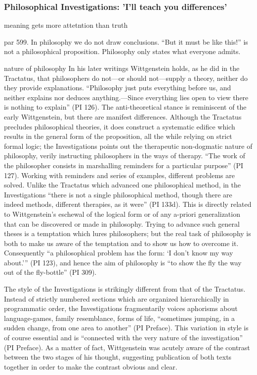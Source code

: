 \documentclass[../main.tex]{subfiles}
\begin{document}
\subsubsection{Philosophical Investigations: 'I'll teach you differences'}

meaning gets more attetntion than truth

par 599. In philosophy we do not draw conclusions. ``But it must be like this!'' is not a philosophical proposition. Philosophy only states what everyone admits.

nature of philosophy
In his later writings Wittgenstein holds, as he did in the Tractatus, that philosophers do not—or should not—supply a theory, neither do they provide explanations. “Philosophy just puts everything before us, and neither explains nor deduces anything.—Since everything lies open to view there is nothing to explain” (PI 126). The anti-theoretical stance is reminiscent of the early Wittgenstein, but there are manifest differences. Although the Tractatus precludes philosophical theories, it does construct a systematic edifice which results in the general form of the proposition, all the while relying on strict formal logic; the Investigations points out the therapeutic non-dogmatic nature of philosophy, verily instructing philosophers in the ways of therapy. “The work of the philosopher consists in marshalling reminders for a particular purpose” (PI 127). Working with reminders and series of examples, different problems are solved. Unlike the Tractatus which advanced one philosophical method, in the Investigations “there is not a single philosophical method, though there are indeed methods, different therapies, as it were” (PI 133d). This is directly related to Wittgenstein's eschewal of the logical form or of any a-priori generalization that can be discovered or made in philosophy. Trying to advance such general theses is a temptation which lures philosophers; but the real task of philosophy is both to make us aware of the temptation and to show us how to overcome it. Consequently “a philosophical problem has the form: ‘I don't know my way about.’” (PI 123), and hence the aim of philosophy is “to show the fly the way out of the fly-bottle” (PI 309).

The style of the Investigations is strikingly different from that of the Tractatus. Instead of strictly numbered sections which are organized hierarchically in programmatic order, the Investigations fragmentarily voices aphorisms about language-games, family resemblance, forms of life, “sometimes jumping, in a sudden change, from one area to another” (PI Preface). This variation in style is of course essential and is “connected with the very nature of the investigation” (PI Preface). As a matter of fact, Wittgenstein was acutely aware of the contrast between the two stages of his thought, suggesting publication of both texts together in order to make the contrast obvious and clear.
\end{document}
